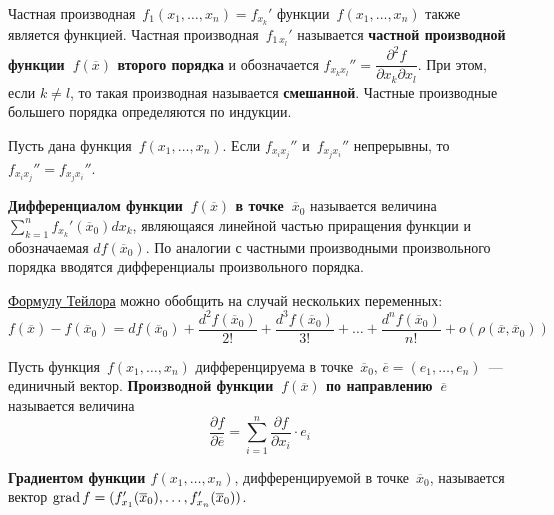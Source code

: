 Частная производная~$f_1(x_1, \ldots, x_n) = f_{x_k}'$ функции~$f(x_1, \ldots, x_n)$ также является функцией.
Частная производная~$f_{1\, x_l}'$ называется \textbf{частной производной функции~$f(\overline x)$ второго порядка} и обозначается $f_{x_k x_l}'' = \dfrac{\partial^2 f}{\partial x_k \partial x_l}$.
При этом, если $k \neq l$, то такая производная называется \textbf{смешанной}.
Частные производные большего порядка определяются по индукции.

\begin{theorem}[Шварца]
Пусть дана функция~$f(x_1, \ldots, x_n)$.
Если $f_{x_i x_j}''$ и~$f_{x_j x_i}''$ непрерывны, то $f_{x_i x_j}'' = f_{x_j x_i}''$.
\end{theorem}

\textbf{Дифференциалом функции~$f(\overline x)$ в точке~$\overline x_0$} называется величина $\displaystyle \sum_{k=1}^n f_{x_k}'(\overline x_0) dx_k$, являющаяся линейной частью приращения функции и обозначаемая $df(\overline x_0)$.
По аналогии с частными производными произвольного порядка вводятся дифференциалы произвольного порядка.

\hyperref[eq:Taylor_series]{Формулу Тейлора} можно обобщить на случай нескольких переменных:
\begin{equation}
\label{eq:Taylor_series_for_several_variables}
f(\overline x) - f(\overline x_0) =
df(\overline x_0) + \frac{d^2 f(\overline x_0)}{2!} + \frac{d^3 f(\overline x_0)}{3!} + \ldots + \frac{d^n f(\overline x_0)}{n!} + o(\rho(\overline x, \overline x_0))
\end{equation}

 Пусть функция~$f(x_1, \ldots, x_n)$ дифференцируема в точке~$\overline x_0$, $\overline e = (e_1, \ldots, e_n)$~--- единичный вектор.
\textbf{Производной функции~$f(\overline x)$ по направлению~$\overline e$} называется величина
\begin{equation*}
\frac{\partial f}{\partial \overline e} = \sum_{i=1}^n \frac{\partial f}{\partial x_i} \cdot e_i
\end{equation*}

  \textbf{Градиентом функции $f(x_1, \ldots, x_n)$}, дифференцируемой в точке~$\overline x_0$, называется вектор $\grad f \opbr= (f_{x_1}'(\overline x_0), \ldots, f_{x_n}'(\overline x_0))$.